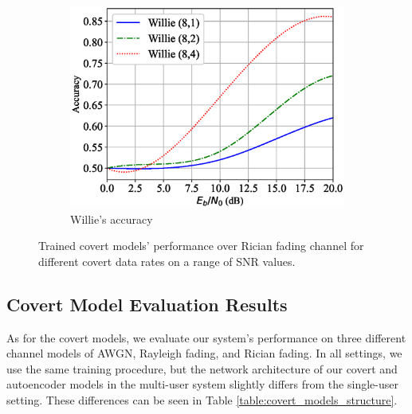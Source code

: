 \begin{figure}[tp!]
\begin{subfigure}{0.28\textwidth}
		\includegraphics[width=\linewidth]{figs/willie_accuracy_rician}
		\caption{Willie's accuracy}
		\label{fig:rician_resutls_willie}
	\end{subfigure}
	\caption{Trained covert models' performance over Rician fading channel for different covert data rates on a range of SNR values.}
	\label{fig:rician_resutls}
\end{figure}


\subsection{Covert Model Evaluation Results}
As for the covert models, we evaluate our system's performance on three different channel models of AWGN, Rayleigh fading, and Rician fading. In all settings, we use the same training procedure, but the network architecture of our covert and autoencoder models in the multi-user system slightly differs from the single-user setting. These differences can be seen in Table \ref{table:covert_models_structure}.

